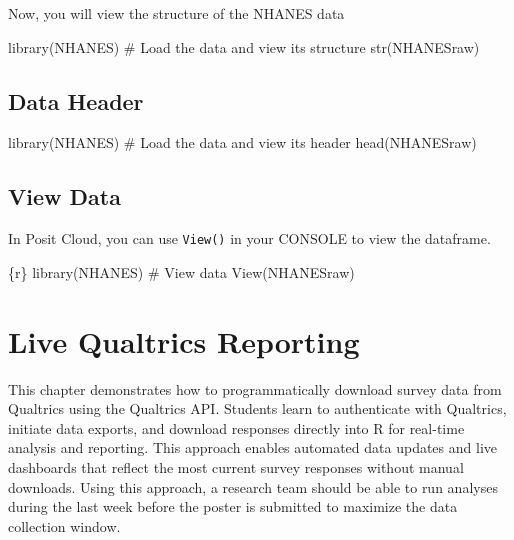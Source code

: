 \documentclass[
  english,
  letterpaper,
  DIV=11,
  numbers=noendperiod]{scrreprt}
\newenvironment{Shaded}{\begin{snugshade}}{\end{snugshade}}
\newcommand{\CommentTok}[1]{\textcolor[rgb]{0.37,0.37,0.37}{#1}}
\newcommand{\FunctionTok}[1]{\textcolor[rgb]{0.28,0.35,0.67}{#1}}
\newcommand{\InformationTok}[1]{\textcolor[rgb]{0.37,0.37,0.37}{#1}}
\newcommand{\NormalTok}[1]{\textcolor[rgb]{0.00,0.23,0.31}{#1}}
\begin{document}
Now, you will view the structure of the NHANES data

\begin{Shaded}
\begin{Highlighting}[]
\NormalTok{library(NHANES)}
\NormalTok{\# Load the data and view its structure}
\NormalTok{str(NHANESraw)}
\end{Highlighting}
\end{Shaded}

\section{Data Header}\label{data-header}

\begin{Shaded}
\begin{Highlighting}[]
\NormalTok{library(NHANES)}
\NormalTok{\# Load the data and view its header}
\NormalTok{head(NHANESraw)}
\end{Highlighting}
\end{Shaded}

\section{View Data}\label{view-data}

In Posit Cloud, you can use \texttt{View()} in your CONSOLE to view the
dataframe.

\begin{Shaded}
\begin{Highlighting}[]
\InformationTok{\textasciigrave{}\textasciigrave{}\textasciigrave{}\{r\}}
\FunctionTok{library}\NormalTok{(NHANES)}
\CommentTok{\# View data}
\FunctionTok{View}\NormalTok{(NHANESraw)}
\InformationTok{\textasciigrave{}\textasciigrave{}\textasciigrave{}}
\end{Highlighting}
\end{Shaded}

\chapter{Live Qualtrics Reporting}\label{live-qualtrics-reporting}

This chapter demonstrates how to programmatically download survey data
from Qualtrics using the Qualtrics API. Students learn to authenticate
with Qualtrics, initiate data exports, and download responses directly
into R for real-time analysis and reporting. This approach enables
automated data updates and live dashboards that reflect the most current
survey responses without manual downloads. Using this approach, a
research team should be able to run analyses during the last week before
the poster is submitted to maximize the data collection window.
\end{document}
